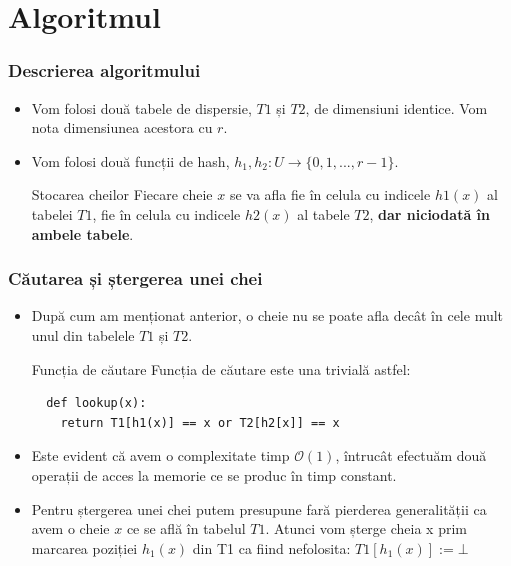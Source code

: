 \documentclass{beamer}
\begin{document}
\section{Algoritmul}

\begin{frame}
\frametitle{Descrierea algoritmului}
\begin{itemize}
\item Vom folosi două tabele de dispersie, $T1$ și $T2$, de dimensiuni identice. Vom nota dimensiunea acestora cu $r$.
\item Vom folosi două funcții de hash, $h_1, h_2: U \to \{0, 1, ..., r-1\}$.
\begin{block}{Stocarea cheilor}
Fiecare cheie $x$ se va afla fie în celula cu indicele $h1(x)$ al tabelei $T1$, fie în celula cu indicele $h2(x)$ al tabele $T2$, \textbf{dar niciodată în ambele tabele}.
\end{block}
\end{itemize}

\end{frame}
\begin{frame}[fragile]
\frametitle{Căutarea și ștergerea unei chei}
\begin{itemize}
\item După cum am menționat anterior, o cheie nu se poate afla decât în cele mult unul din tabelele $T1$ și $T2$.
\begin{block}{Funcția de căutare}
Funcția de căutare este una trivială astfel:
\begin{lstlisting}
  def lookup(x):
   	return T1[h1(x)] == x or T2[h2[x]] == x
\end{lstlisting}
\end{block}
\item Este evident că avem o complexitate timp $\mathcal{O}(1)$, întrucât efectuăm două operații de acces la memorie ce se produc în timp constant.
\item Pentru ștergerea unei chei putem presupune fară pierderea generalității ca avem o cheie $x$ ce se află în tabelul $T1$. Atunci vom șterge cheia x prim marcarea poziției $h_1(x)$ din T1 ca fiind nefolosita: $T1[h_1(x)] := \bot$
\end{itemize}

\end{frame}
\end{document}
